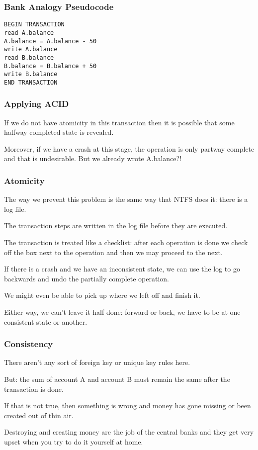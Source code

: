 \begin{frame}[fragile]
\frametitle{Bank Analogy Pseudocode}

\begin{verbatim}
BEGIN TRANSACTION
read A.balance
A.balance = A.balance - 50
write A.balance
read B.balance
B.balance = B.balance + 50
write B.balance
END TRANSACTION
\end{verbatim}

\end{frame}

\begin{frame}
\frametitle{Applying ACID}
If we do not have atomicity in this transaction then it is possible that some halfway completed state is revealed.

Moreover, if we have a crash at this stage, the operation is only partway complete and that is undesirable. But we already wrote A.balance?!

\end{frame}


\begin{frame}
\frametitle{Atomicity}

The way we prevent this problem is the same way that NTFS does it: there is a log file. 

The transaction steps are written in the log file before they are executed. 

The transaction is treated like a checklist: after each operation is done we check off the box next to the operation and then we may proceed to the next. 

If there is a crash and we have an inconsistent state, we can use the log to go backwards and undo the partially complete operation.

We might even be able to pick up where we left off and finish it. 

Either way, we can't leave it half done: forward or back, we have to be at one consistent state or another.


\end{frame}

\begin{frame}
\frametitle{Consistency}
There aren't any sort of foreign key or unique key rules here.

But: the sum of account A and account B must remain the same after the transaction is done. 

If that is not true, then something is wrong and money has gone missing or been created out of thin air. 

Destroying and creating money are the job of the central banks and they get very upset when you try to do it yourself at home. 

\end{frame}


